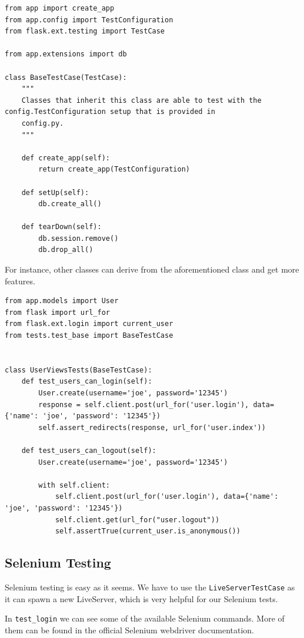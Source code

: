 \documentclass[../main/main.tex]{subfiles}
\begin{document}
\begin{lstlisting}
from app import create_app
from app.config import TestConfiguration
from flask.ext.testing import TestCase

from app.extensions import db

class BaseTestCase(TestCase):
    """
    Classes that inherit this class are able to test with the config.TestConfiguration setup that is provided in
    config.py.
    """

    def create_app(self):
        return create_app(TestConfiguration)

    def setUp(self):
        db.create_all()

    def tearDown(self):
        db.session.remove()
        db.drop_all()
\end{lstlisting}

For instance, other classes can derive from the aforementioned class and get
more features. 

\begin{lstlisting}
from app.models import User
from flask import url_for
from flask.ext.login import current_user
from tests.test_base import BaseTestCase


class UserViewsTests(BaseTestCase):
    def test_users_can_login(self):
        User.create(username='joe', password='12345')
        response = self.client.post(url_for('user.login'), data={'name': 'joe', 'password': '12345'})
        self.assert_redirects(response, url_for('user.index'))

    def test_users_can_logout(self):
        User.create(username='joe', password='12345')

        with self.client:
            self.client.post(url_for('user.login'), data={'name': 'joe', 'password': '12345'})
            self.client.get(url_for("user.logout"))
            self.assertTrue(current_user.is_anonymous())
\end{lstlisting}

\subsection{Selenium Testing}

Selenium testing is easy as it seems. We have to use the
\lstinline|LiveServerTestCase| as it can spawn a new LiveServer, which is very
helpful for our Selenium tests. 

In \lstinline|test_login| we can see some of the available Selenium commands.
More of them can be found in the official Selenium webdriver documentation. 
\end{document}
